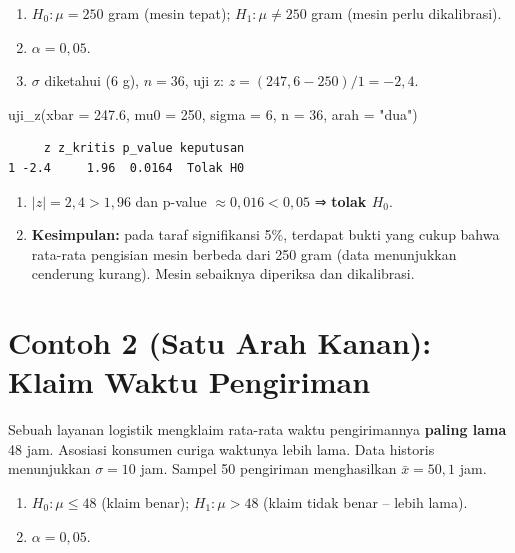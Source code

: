 \documentclass[
  indonesian,
  letterpaper,
]{book}
\newenvironment{Shaded}{\begin{snugshade}}{\end{snugshade}}
\newcommand{\AttributeTok}[1]{\textcolor[rgb]{0.40,0.45,0.13}{#1}}
\newcommand{\DecValTok}[1]{\textcolor[rgb]{0.68,0.00,0.00}{#1}}
\newcommand{\FloatTok}[1]{\textcolor[rgb]{0.68,0.00,0.00}{#1}}
\newcommand{\FunctionTok}[1]{\textcolor[rgb]{0.28,0.35,0.67}{#1}}
\newcommand{\NormalTok}[1]{\textcolor[rgb]{0.00,0.23,0.31}{#1}}
\newcommand{\StringTok}[1]{\textcolor[rgb]{0.13,0.47,0.30}{#1}}
\providecommand{\tightlist}{%
  \setlength{\itemsep}{0pt}\setlength{\parskip}{0pt}}
\begin{document}
\begin{enumerate}
\def\labelenumi{\arabic{enumi}.}
\tightlist
\item
  \(H_0: \mu = 250\) gram (mesin tepat); \(H_1: \mu \neq 250\) gram
  (mesin perlu dikalibrasi).
\item
  \(\alpha = 0{,}05\).
\item
  \(\sigma\) diketahui (6 g), \(n = 36\), uji z:
  \(z = (247{,}6 - 250)/1 = -2{,}4\).
\end{enumerate}

\begin{Shaded}
\begin{Highlighting}[]
\FunctionTok{uji\_z}\NormalTok{(}\AttributeTok{xbar =} \FloatTok{247.6}\NormalTok{, }\AttributeTok{mu0 =} \DecValTok{250}\NormalTok{, }\AttributeTok{sigma =} \DecValTok{6}\NormalTok{, }\AttributeTok{n =} \DecValTok{36}\NormalTok{, }\AttributeTok{arah =} \StringTok{"dua"}\NormalTok{)}
\end{Highlighting}
\end{Shaded}

\begin{verbatim}
     z z_kritis p_value keputusan
1 -2.4     1.96  0.0164  Tolak H0
\end{verbatim}

\begin{enumerate}
\def\labelenumi{\arabic{enumi}.}
\setcounter{enumi}{3}
\tightlist
\item
  \(\lvert z \rvert = 2{,}4 > 1{,}96\) dan p-value
  \(\approx 0{,}016 < 0{,}05\) ⇒ \textbf{tolak \(H_0\)}.
\item
  \textbf{Kesimpulan:} pada taraf signifikansi 5\%, terdapat bukti yang
  cukup bahwa rata-rata pengisian mesin berbeda dari 250 gram (data
  menunjukkan cenderung kurang). Mesin sebaiknya diperiksa dan
  dikalibrasi.
\end{enumerate}

\section{Contoh 2 (Satu Arah Kanan): Klaim Waktu
Pengiriman}\label{contoh-2-satu-arah-kanan-klaim-waktu-pengiriman}

Sebuah layanan logistik mengklaim rata-rata waktu pengirimannya
\textbf{paling lama} 48 jam. Asosiasi konsumen curiga waktunya lebih
lama. Data historis menunjukkan \(\sigma = 10\) jam. Sampel 50
pengiriman menghasilkan \(\bar{x} = 50{,}1\) jam.

\begin{enumerate}
\def\labelenumi{\arabic{enumi}.}
\tightlist
\item
  \(H_0: \mu \leq 48\) (klaim benar); \(H_1: \mu > 48\) (klaim tidak
  benar -- lebih lama).
\item
  \(\alpha = 0{,}05\).
\end{enumerate}
\end{document}
